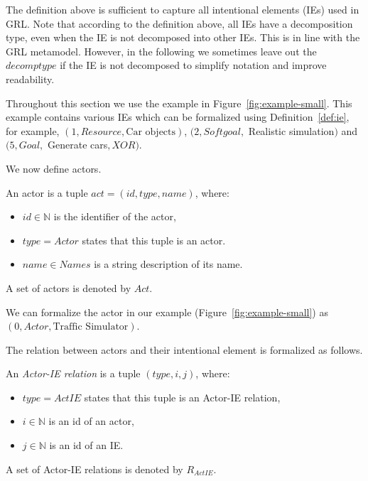 The definition above is sufficient to capture all intentional elements (IEs) used in GRL. Note that according to the definition above, all IEs have a decomposition type, even when the IE is not decomposed into other IEs. This is in line with the GRL metamodel. However, in the following we sometimes leave out the $decomptype$ if the IE is not decomposed to simplify notation and improve readability.

Throughout this section we use the example in Figure~\ref{fig:example-small}. This example contains various IEs which can be formalized using Definition~\ref{def:ie}, for example, 
$(1, Resource, \text{Car objects})$, $(2, Softgoal,$ Realistic simulation$)$ and $(5, Goal,$ Generate cars$, XOR)$.

We now define actors.

\begin{definition}[Actor]
\label{def:actor}
An actor is a tuple $act=(id,type, name)$, where:
\begin{itemize}
\item $id\in\mathbb{N}$ is the identifier of the actor, 
\item $type = Actor$ states that this tuple is an actor.
\item $name\in Names$ is a string description of its name.
\end{itemize}
A set of actors is denoted by $Act$.
\end{definition}
We can formalize the actor in our example (Figure~\ref{fig:example-small}) as $(0,Actor,\text{Traffic Simulator})$.%

The relation between actors and their intentional element is formalized as follows. 

\begin{definition}
\label{def:act-ie-relation}
An \emph{Actor-IE relation} is a tuple $(type, i, j)$, where:
\begin{itemize}
\item $type = ActIE$ states that this tuple is an Actor-IE relation,
\item $i\in\mathbb{N}$ is an id of an actor,
\item $j\in\mathbb{N}$ is an id of an IE.
\end{itemize}

A set of Actor-IE relations is denoted by $R_{ActIE}$.
\end{definition}

